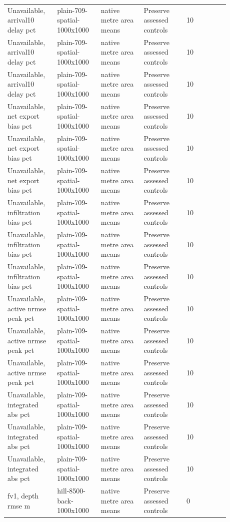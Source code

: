 \begin{longtable}{p{0.1760\linewidth}p{0.1760\linewidth}p{0.1760\linewidth}p{0.1760\linewidth}p{0.1760\linewidth}}
Unavailable, arrival10 delay pct & plain-709-spatial-1000x1000 & native metre area means & Preserve assessed controls & 10 \\
Unavailable, arrival10 delay pct & plain-709-spatial-1000x1000 & native metre area means & Preserve assessed controls & 10 \\
Unavailable, arrival10 delay pct & plain-709-spatial-1000x1000 & native metre area means & Preserve assessed controls & 10 \\
Unavailable, net export bias pct & plain-709-spatial-1000x1000 & native metre area means & Preserve assessed controls & 10 \\
Unavailable, net export bias pct & plain-709-spatial-1000x1000 & native metre area means & Preserve assessed controls & 10 \\
Unavailable, net export bias pct & plain-709-spatial-1000x1000 & native metre area means & Preserve assessed controls & 10 \\
Unavailable, infiltration bias pct & plain-709-spatial-1000x1000 & native metre area means & Preserve assessed controls & 10 \\
Unavailable, infiltration bias pct & plain-709-spatial-1000x1000 & native metre area means & Preserve assessed controls & 10 \\
Unavailable, infiltration bias pct & plain-709-spatial-1000x1000 & native metre area means & Preserve assessed controls & 10 \\
Unavailable, active nrmse peak pct & plain-709-spatial-1000x1000 & native metre area means & Preserve assessed controls & 10 \\
Unavailable, active nrmse peak pct & plain-709-spatial-1000x1000 & native metre area means & Preserve assessed controls & 10 \\
Unavailable, active nrmse peak pct & plain-709-spatial-1000x1000 & native metre area means & Preserve assessed controls & 10 \\
Unavailable, integrated abs pct & plain-709-spatial-1000x1000 & native metre area means & Preserve assessed controls & 10 \\
Unavailable, integrated abs pct & plain-709-spatial-1000x1000 & native metre area means & Preserve assessed controls & 10 \\
Unavailable, integrated abs pct & plain-709-spatial-1000x1000 & native metre area means & Preserve assessed controls & 10 \\
fv1, depth rmse m & hill-8500-back-1000x1000 & native metre area means & Preserve assessed controls & 0 \\

\end{longtable}
